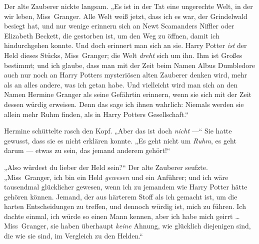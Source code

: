 Der alte Zauberer nickte langsam.
„Es ist in der Tat eine ungerechte Welt, in der wir leben, Miss~Granger. Alle Welt weiß jetzt, dass ich es war, der Grindelwald besiegt hat, und nur wenige erinnern sich an Newt Scamanders Niffler oder Elizabeth Beckett, die gestorben ist, um den Weg zu öffnen, damit ich hindurchgehen konnte. Und doch erinnert man sich an sie. Harry Potter \emph{ist} der Held dieses Stücks, Miss~Granger; die Welt \emph{dreht} sich um ihn. Ihm ist Großes bestimmt; und ich glaube, dass man mit der Zeit beim Namen Albus Dumbledore auch nur noch an Harry Potters mysteriösen alten Zauberer denken wird, mehr als an alles andere, was ich getan habe. Und vielleicht wird man sich an den Namen Hermine Granger als seine Gefährtin erinnern, wenn sie sich mit der Zeit dessen würdig erweisen. Denn das sage ich ihnen wahrlich: Niemals werden sie allein mehr Ruhm finden, als in Harry Potters Gesellschaft.“

Hermine schüttelte rasch den Kopf.
„Aber das ist doch \emph{nicht} —“ Sie hatte gewusst, dass sie es nicht erklären konnte.
„Es geht nicht um \emph{Ruhm}, es geht darum — etwas zu sein, das jemand anderem gehört!“

„Also würdest du lieber der Held sein?“ Der alte Zauberer seufzte.
„Miss~Granger, ich bin ein Held \emph{gewesen} und ein Anführer; und ich wäre tausendmal glücklicher gewesen, wenn ich zu jemandem wie Harry Potter hätte gehören können. Jemand, der aus härterem Stoff als ich gemacht ist, um die harten Entscheidungen zu treffen, und dennoch würdig ist, mich zu führen. Ich dachte einmal, ich würde so einen Mann kennen, aber ich habe mich geirrt … Miss~Granger, sie haben überhaupt \emph{keine} Ahnung, wie glücklich diejenigen sind, die wie sie sind, im Vergleich zu den Helden.“

